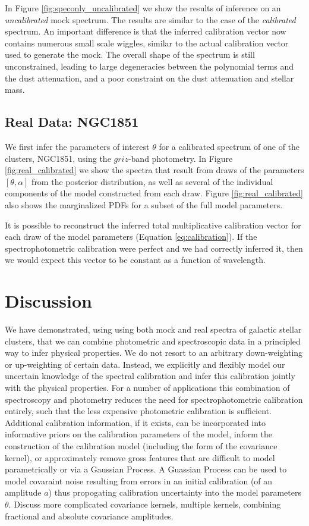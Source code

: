 \documentclass[iop,numberedappendix]{emulateapj}
\newcommand{\excluster}{NGC1851}
\begin{document}
In Figure \ref{fig:speconly_uncalibrated} we show the results of
inference on an \emph{uncalibrated} mock spectrum.  The results are
similar to the case of the \emph{calibrated} spectrum. An important
difference is that the inferred calibration vector now contains
numerous small scale wiggles, similar to the actual calibration vector
used to generate the mock.  The overall shape of the spectrum is still
unconstrained, leading to large degeneracies between the polynomial
terms and the dust attenuation, and a poor constraint on the dust
attenuation and stellar mass.


\subsection{Real Data: \excluster} 
We first infer the parameters of interest $\theta$ for a calibrated
spectrum of one of the clusters, \excluster, using the $griz$-band
photometry. In Figure \ref{fig:real_calibrated} we show the spectra
that result from draws of the parameters $[\theta,\alpha]$ from the
posterior distribution, as well as several of the individual
components of the model constructed from each draw. Figure
\ref{fig:real_calibrated} also shows the marginalized PDFs for a
subset of the full model parameters.

It is possible to reconstruct the inferred total multiplicative
calibration vector for each draw of the model parameters (Equation
\ref{eq:calibration}). If the spectrophotometric calibration were
perfect and we had correctly inferred it, then we would expect this
vector to be constant as a function of wavelength.


\section{Discussion}

We have demonstrated, using using both mock and real spectra of
galactic stellar clusters, that we can combine photometric and
spectroscopic data in a principled way to infer physical properties.
We do not resort to an arbitrary down-weighting or up-weighting of
certain data. Instead, we explicitly and flexibly model our uncertain
knowledge of the spectral calibration and infer this calibration
jointly with the physical properties. For a number of applications
this combination of spectroscopy and photometry reduces the need for
spectrophotometric calibration entirely, such that the less expensive
photometric calibration is sufficient.  Additional calibration
information, if it exists, can be incorporated into informative priors
on the calibration parameters of the model, inform the construction of
the calibration model (including the form of the covariance kernel),
or approximately remove gross features that are difficult to model
parametrically or via a Gaussian Process. A Guassian Process can be
used to model covaraint noise resulting from errors in an initial
calibration (of an amplitude $a$) thus propogating calibration
uncertainty into the model parameters $\theta$. 
{\color{blue} Discuss more complicated covariance kernels, multiple
kernels, combining fractional and absolute covariance amplitudes.}
\end{document}
